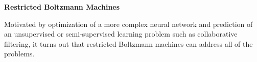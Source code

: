 
\noindent
\large
{\bf Restricted Boltzmann Machines}
\normalsize

Motivated by optimization of a more complex neural network
and prediction of an unsupervised or semi-supervised learning problem
such as collaborative filtering,
it turns out that restricted Boltzmann machines can address 
all of the problems. 






